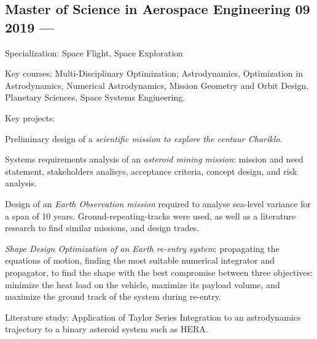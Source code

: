 


\subsection{{Master of Science in Aerospace Engineering} \hfill 09 2019 --- }
\begin{zitemize}
\item Specialization: Space Flight, Space Exploration
\item Key courses: Multi-Disciplinary Optimization; Astrodynamics, Optimization in Astrodynamics, Numerical Astrodynamics, Mission Geometry and Orbit Design, Planetary Sciences, Space Systems Engineering. 
\item Key projects: \begin{zitemize}
\item Preliminary design of a \textit{scientific mission to explore the centaur Chariklo}.
\item Systems requirements analysis of an \textit{asteroid mining mission}: mission and need statement, stakeholders analisys, acceptance criteria, concept design, and risk analysis.
\item Design of an \textit{Earth Observation mission} required to analyse sea-level variance for a span of 10 years. Ground-repeating-tracks were used, as well as a literature research to find similar missions, and design trades.
\item \textit{Shape Design Optimization of an Earth re-entry system}: propagating the equations of motion, finding the most suitable numerical integrator and propagator, to find the shape with the best compromise between three objectives: minimize the heat load on the vehicle, maximize its payload volume, and maximize the ground track of the system during re-entry.
\end{zitemize}
\item Literature study: Application of Taylor Series Integration to an astrodynamics trajectory to a binary asteroid system such as HERA. 

\end{zitemize}
